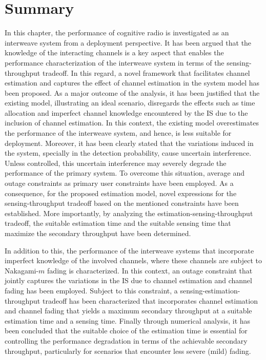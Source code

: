 {\section{Summary} \label{sec_IS:conc}
In this chapter, the performance of cognitive radio is investigated as an interweave system from a deployment perspective. It has been argued that the knowledge of the interacting channels is a key aspect that enables the performance characterization of the interweave system in terms of the sensing-throughput tradeoff. In this regard, a novel framework that facilitates channel estimation and captures the effect of channel estimation in the system model has been proposed. As a major outcome of the analysis, it has been justified that the existing model, illustrating an ideal scenario, disregards the effects such as time allocation and imperfect channel knowledge encountered by the IS due to the inclusion of channel estimation. In this context, the existing model overestimates the performance of the interweave system, and hence, is less suitable for deployment. Moreover, it has been clearly stated that the variations induced in the system, specially in the detection probability, cause uncertain interference. Unless controlled, this uncertain interference may severely degrade the performance of the primary system. To overcome this situation, average and outage constraints as primary user constraints have been employed. As a consequence, for the proposed estimation model, novel expressions for the sensing-throughput tradeoff based on the mentioned constraints have been established. More importantly, by analyzing the estimation-sensing-throughput tradeoff, the suitable estimation time and the suitable sensing time that maximize the secondary throughput have been determined. %

In addition to this, the performance of the interweave systems that incorporate imperfect knowledge of the involved channels, where these channels are subject to Nakagami-$m$ fading is characterized. In this context, an outage constraint that jointly captures the variations in the IS due to channel estimation and channel fading has been employed. Subject to this constraint, a sensing-estimation-throughput tradeoff has been characterized that incorporates channel estimation and channel fading that yields a maximum secondary throughput at a suitable estimation time and a sensing time. Finally through numerical analysis, it has been concluded that the suitable choice of the estimation time is essential for controlling the performance degradation in terms of the achievable secondary throughput, particularly for scenarios that encounter less severe (mild) fading.

}
